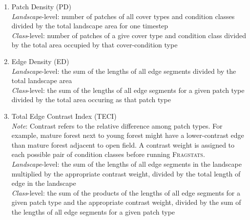 \begin{itemize}
\begin{enumerate}

		\item Patch Density (PD)\\
		\emph{Landscape}-level: number of patches of all cover types and condition classes divided by the total landscape area for one timestep\\
		\emph{Class}-level: number of patches of a give cover type and condition class divided by the total area occupied by that cover-condition type\\
		
		\item Edge Density (ED) \\
		\label{item:ED}
		\emph{Landscape}-level: the sum of the lengths of all edge segments divided by the total landscape area\\	
		\emph{Class}-level: the sum of the lengths of all edge segments for a given patch type divided by the total area occuring as that patch type\\

		\item Total Edge Contrast Index (TECI) \\
		\label{item:TECI}
		\emph{Note}: Contrast refers to the relative difference among patch types. For example, mature forest next to young forest might have a lower-contrast edge than mature forest adjacent to open field. A contrast weight is assigned to each possible pair of condition classes before running \textsc{Fragstats}. 	\\
		\emph{Landscape}-level: the sum of the lengths of all edge segments in the landscape multiplied by the appropriate contrast weight, divided by the total length of edge in the landscape\\
		\emph{Class}-level: the sum of the products of the lengths of all edge segments for a given patch type and the appropriate contrast weight, divided by the sum of the lengths of all edge segments for a given patch type \\
		
		

\end{enumerate}
\end{itemize}
